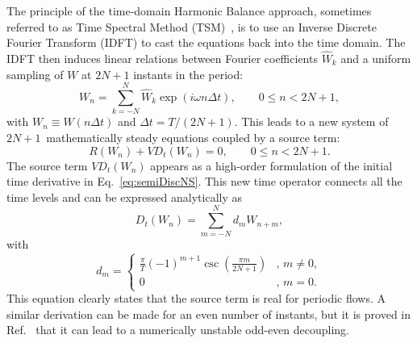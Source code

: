 The principle of the time-domain Harmonic Balance approach, sometimes
referred to as Time Spectral Method (TSM)~\cite{Gopinath2005,
  Sicot2008}, is to use an Inverse Discrete Fourier Transform (IDFT)
to cast the equations back into the time domain.  The IDFT then
induces linear relations between Fourier coefficients $\widehat{W}_k$
and a uniform sampling of $W$ at $2N+1$ instants in the period:
\begin{equation}
  W_n=\sum_{k=-N}^N\widehat{W}_k\exp(i\omega n\Delta t),\quad \quad 0 \leq n < 2N+1,
\end{equation}
with $W_n \equiv W(n \Delta t)$ and $\Delta t=T/(2N+1)$. This leads to
a new system of $2N+1$~mathematically steady equations coupled by a
source term:
\begin{equation}
  \label{eq:hbttime}
  R(W_n)+VD_t(W_n)=0, \quad \quad 0 \leq n < 2N+1.
\end{equation}
The source term $VD_t(W_n)$ appears as a high-order formulation of the
initial time derivative in Eq.~\eqref{eq:semiDiscNS}. This new time
operator connects all the time levels and can be expressed
analytically as
\begin{equation}
\label{eq:dt}
  D_t(W_n)=\sum_{m=-N}^{N} d_m W_{n+m},
\end{equation}
with
\begin{equation}
  d_m=
  \begin{cases}
    \frac{\pi}{T}(-1)^{m+1}\csc\left(\frac{\pi
        m}{2N+1}\right) &, \, m\neq 0,\\
    0 &, \, m=0.
  \end{cases}
\end{equation}
This equation clearly states that the source term is real for periodic flows.
A similar derivation can be made for an even number of instants, but
it is proved in Ref.~\cite{Weide2005} that it can lead to a numerically unstable odd-even
decoupling. %

